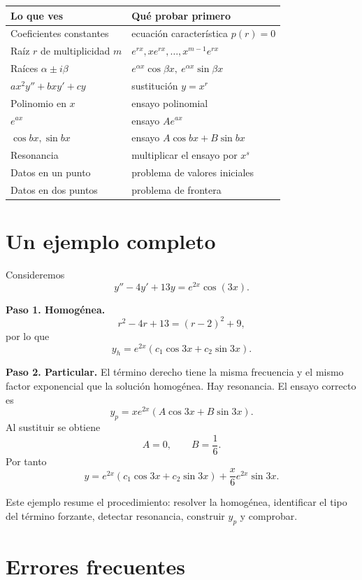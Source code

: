 \documentclass[11pt]{article}
\theoremstyle{definition}
\begin{document}
\begin{center}
\begin{tabular}{>{\raggedright}p{}p{}}
\toprule
\textbf{Lo que ves} & \textbf{Qué probar primero}\\
\midrule
Coeficientes constantes & ecuación característica $p(r)=0$\\
Raíz $r$ de multiplicidad $m$ & $e^{rx},xe^{rx},\ldots,x^{m-1}e^{rx}$\\
Raíces $\alpha\pm i\beta$ & $e^{\alpha x}\cos\beta x,\ e^{\alpha x}\sin\beta x$\\
$ax^2y''+bxy'+cy$ & sustitución $y=x^r$\\
Polinomio en $x$ & ensayo polinomial\\
$e^{ax}$ & ensayo $Ae^{ax}$\\
$\cos bx,\sin bx$ & ensayo $A\cos bx+B\sin bx$\\
Resonancia & multiplicar el ensayo por $x^s$\\
Datos en un punto & problema de valores iniciales\\
Datos en dos puntos & problema de frontera\\
\bottomrule
\end{tabular}
\end{center}


\section{Un ejemplo completo}

Consideremos
\[
y''-4y'+13y=e^{2x}\cos(3x).
\]

\textbf{Paso 1. Homogénea.}
\[
r^2-4r+13=(r-2)^2+9,
\]
por lo que
\[
y_h=e^{2x}(c_1\cos3x+c_2\sin3x).
\]

\textbf{Paso 2. Particular.}
El término derecho tiene la misma frecuencia y el mismo factor exponencial que
la solución homogénea. Hay resonancia. El ensayo correcto es
\[
y_p=xe^{2x}(A\cos3x+B\sin3x).
\]
Al sustituir se obtiene
\[
A=0,\qquad B=\frac16.
\]
Por tanto
\[
\boxed{
y=e^{2x}(c_1\cos3x+c_2\sin3x)
+\frac{x}{6}e^{2x}\sin3x}.
\]

Este ejemplo resume el procedimiento: resolver la homogénea, identificar el tipo
del término forzante, detectar resonancia, construir $y_p$ y comprobar.

\section{Errores frecuentes}
\end{document}
